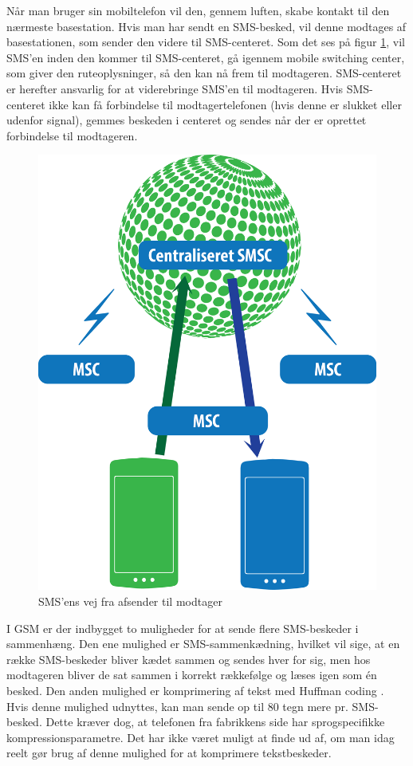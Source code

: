 Når man bruger sin mobiltelefon vil den, gennem luften, skabe kontakt til den nærmeste basestation. Hvis man har sendt en SMS-besked, vil denne modtages af basestationen, som sender den videre til SMS-centeret. Som det ses på figur \ref{GSM}, vil SMS'en inden den kommer til SMS-centeret, gå igennem mobile switching center, som giver den ruteoplysninger, så den kan nå frem til modtageren. SMS-centeret er herefter ansvarlig for at viderebringe SMS’en til modtageren. Hvis SMS-centeret ikke kan få forbindelse til modtagertelefonen (hvis denne er slukket eller udenfor signal), gemmes beskeden i centeret og sendes når der er oprettet forbindelse til modtageren. \cite{info}

\begin{figure}[H]
\centering
\includegraphics [width=0.6\linewidth]{Billeder/GSMnetvaerk.png}
\caption {SMS'ens vej fra afsender til modtager \cite{info}}
\label {GSM}
\end{figure} 

I GSM er der indbygget to muligheder for at sende flere SMS-beskeder i sammenhæng. Den ene mulighed er SMS-sammenkædning, hvilket vil sige, at en række SMS-beskeder bliver kædet sammen og sendes hver for sig, men hos modtageren bliver de sat sammen i korrekt rækkefølge og læses igen som én besked. Den anden mulighed er komprimering af tekst med Huffman coding \cite{UNI}. Hvis denne mulighed udnyttes, kan man sende op til 80 tegn mere pr. SMS-besked. Dette kræver dog, at telefonen fra fabrikkens side har sprogspecifikke kompressionsparametre. Det har ikke været muligt at finde ud af, om man idag reelt gør brug af denne mulighed for at komprimere tekstbeskeder. 

